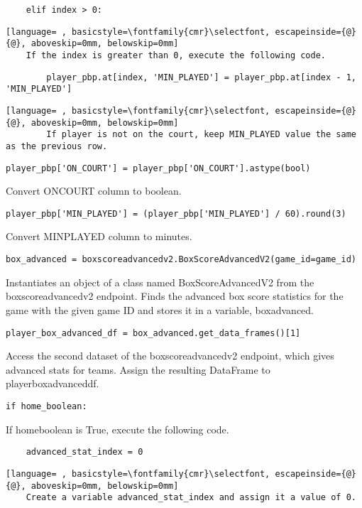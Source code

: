 \documentclass{article}
\begin{document}
\begin{lstlisting}
    elif index > 0:
\end{lstlisting}
\begin{lstlisting}[language= , basicstyle=\fontfamily{cmr}\selectfont, escapeinside={@}{@}, aboveskip=0mm, belowskip=0mm]
    If the index is greater than 0, execute the following code.
\end{lstlisting}
\begin{lstlisting}
        player_pbp.at[index, 'MIN_PLAYED'] = player_pbp.at[index - 1, 'MIN_PLAYED']
\end{lstlisting}
\begin{lstlisting}[language= , basicstyle=\fontfamily{cmr}\selectfont, escapeinside={@}{@}, aboveskip=0mm, belowskip=0mm]
        If player is not on the court, keep MIN_PLAYED value the same as the previous row.
\end{lstlisting}
\begin{lstlisting}
player_pbp['ON_COURT'] = player_pbp['ON_COURT'].astype(bool)
\end{lstlisting}
Convert ON\textunderscore COURT column to boolean.
\begin{lstlisting}
player_pbp['MIN_PLAYED'] = (player_pbp['MIN_PLAYED'] / 60).round(3)
\end{lstlisting}
Convert MIN\textunderscore PLAYED column to minutes.
\begin{lstlisting}
box_advanced = boxscoreadvancedv2.BoxScoreAdvancedV2(game_id=game_id)
\end{lstlisting}
Instantiates an object of a class named BoxScoreAdvancedV2 from the boxscoreadvancedv2 endpoint. Finds the advanced box score statistics for the game with the given game ID and stores it in a variable, box\textunderscore advanced.
\begin{lstlisting}
player_box_advanced_df = box_advanced.get_data_frames()[1]
\end{lstlisting}
Access the second dataset of the boxscoreadvancedv2 endpoint, which gives advanced stats for teams. Assign the resulting DataFrame to player\textunderscore box\textunderscore advanced\textunderscore df.
\begin{lstlisting}
if home_boolean:
\end{lstlisting}
If home\textunderscore boolean is True, execute the following code.
\begin{lstlisting}
    advanced_stat_index = 0
\end{lstlisting}
\begin{lstlisting}[language= , basicstyle=\fontfamily{cmr}\selectfont, escapeinside={@}{@}, aboveskip=0mm, belowskip=0mm]
    Create a variable advanced_stat_index and assign it a value of 0.
\end{lstlisting}
\end{document}
